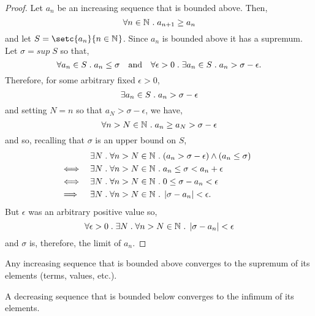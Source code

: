 \documentclass[MathsNotesBase.tex]{subfiles}
\begin{document}
{		\bigskip
		\begin{proof}
			Let $a_n$ be an increasing sequence that is bounded above. Then,
			\[ \forall n \in \mathbb{N}^{} \;.\; a_{n+1} \geq a_n \]
			and let ${ S = \setc{a_n}{n \in \N{}} }$. Since $a_n$ is bounded above it has a supremum. Let $ \sigma = sup \; S $ so that,
			\[ \forall a_n \in S \;.\; a_n \leq \sigma \hspace{10pt}\text{and}\hspace{10pt} \forall \epsilon > 0 \;.\; \exists a_n \in S \;.\; a_n > \sigma - \epsilon. \]
			Therefore, for some arbitrary fixed $\epsilon > 0$,
			\[ \exists a_n \in S \;.\; a_n > \sigma - \epsilon \] 
			and setting $ N = n $ so that $ a_N > \sigma - \epsilon $, we have,
			\[ \forall n > N \in \mathbb{N}^{} \;.\; a_n \geq a_N > \sigma - \epsilon \]
			and so, recalling that $\sigma$ is an upper bound on $S$,
			\begin{align*}
			&& \exists N \;.\; \forall n > N \in \mathbb{N}^{} &\;.\; (a_n > \sigma - \epsilon) \wedge (a_n \leq \sigma) \\
			&\iff &\exists N \;.\; \forall n > N \in \mathbb{N}^{} &\;.\; a_n \leq \sigma < a_n + \epsilon  &\text{\scriptsize{}}\\
			&\iff &\exists N \;.\; \forall n > N \in \mathbb{N}^{} &\;.\; 0 \leq \sigma - a_n < \epsilon  &\text{\scriptsize{}}\\
			&\implies &\exists N \;.\; \forall n > N \in \mathbb{N}^{} &\;.\; \left\lvert\sigma - a_n\right\rvert < \epsilon.
			\end{align*}
			But $\epsilon$ was an arbitrary positive value so,
			\[ \forall \epsilon > 0 \;.\; \exists N \;.\; \forall n > N \in \mathbb{N}^{} \;.\; \left\lvert\sigma - a_n\right\rvert < \epsilon \]
			and $\sigma$ is, therefore, the limit of $a_n.$
		\end{proof}
		
		\bigskip
		\begin{corollary}
			Any increasing sequence that is bounded above converges to the supremum of its elements (terms, values, etc.).
		\end{corollary}
		\begin{corollary}
			A decreasing sequence that is bounded below converges to the infimum of its elements.
		\end{corollary}
	}
\end{document}
